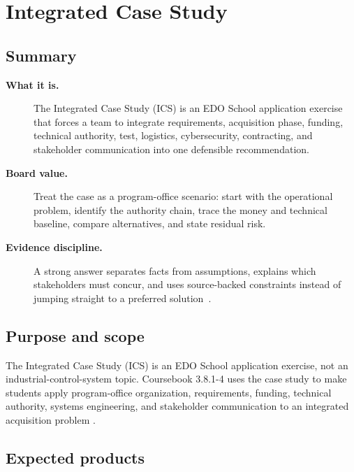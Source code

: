 \documentclass[../main.tex]{subfiles}
\begin{document}

\section{Integrated Case Study}

\subsection{Summary}
\begin{description}
  \item[\textbf{What it is.}] The Integrated Case Study (ICS) is an EDO School application exercise that
  forces a team to integrate requirements, acquisition phase, funding, technical authority, test,
  logistics, cybersecurity, contracting, and stakeholder communication into one defensible recommendation.
  \item[\textbf{Board value.}] Treat the case as a program-office scenario: start with the operational
  problem, identify the authority chain, trace the money and technical baseline, compare alternatives,
  and state residual risk.
  \item[\textbf{Evidence discipline.}] A strong answer separates facts from assumptions, explains which
  stakeholders must concur, and uses source-backed constraints instead of jumping straight to a preferred
  solution~\autocite{SECNAV5000-2G,SECNAV5400-15D,DoDI5000-85,edo-3-8-1-ics-introduction-2025}.
\end{description}

\subsection{Purpose and scope}

The Integrated Case Study (ICS) is an EDO School application exercise, not an
industrial-control-system topic.  Coursebook 3.8.1-4 uses the case study to
make students apply program-office organization, requirements, funding,
technical authority, systems engineering, and stakeholder communication to an
integrated acquisition problem
\autocite{edo-3-8-1-ics-introduction-2025}.

\subsection{Expected products}
\end{document}

